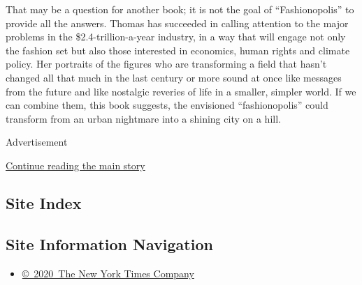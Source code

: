 That may be a question for another book; it is not the goal of
``Fashionopolis'' to provide all the answers. Thomas has succeeded in
calling attention to the major problems in the \$2.4-trillion-a-year
industry, in a way that will engage not only the fashion set but also
those interested in economics, human rights and climate policy. Her
portraits of the figures who are transforming a field that hasn't
changed all that much in the last century or more sound at once like
messages from the future and like nostalgic reveries of life in a
smaller, simpler world. If we can combine them, this book suggests, the
envisioned ``fashionopolis'' could transform from an urban nightmare
into a shining city on a hill.

Advertisement

\protect\hyperlink{after-bottom}{Continue reading the main story}

\hypertarget{site-index}{%
\subsection{Site Index}\label{site-index}}

\hypertarget{site-information-navigation}{%
\subsection{Site Information
Navigation}\label{site-information-navigation}}

\begin{itemize}
\tightlist
\item
  \href{https://help.nytimes3xbfgragh.onion/hc/en-us/articles/115014792127-Copyright-notice}{©~2020~The
  New York Times Company}
\end{itemize}

